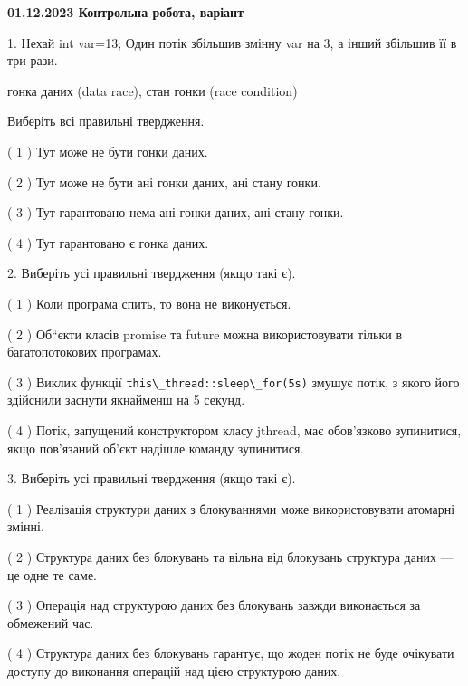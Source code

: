 \documentclass[12pt, ukrainian]{article}
\def\code#1{\Verb!#1!}
\begin{document}
\vspace{4mm}
\newpage
\begin {large}

\textbf{01.12.2023 Контрольна робота, варіант  }\par


{
1. Нехай int var=13; Один потік збільшив змінну var на 3, а інший збільшив її в три рази.

гонка даних (data race), стан гонки (race condition)

Виберіть всі правильні твердження.\par
\vspace{2mm}
( 1 ) Тут може не бути гонки даних.%

( 2 ) Тут може не бути ані гонки даних, ані стану гонки.%

( 3 ) Тут гарантовано нема ані гонки даних, ані стану гонки.%

( 4 ) Тут гарантовано є гонка даних.%


\vspace{5mm}
2. Виберіть усі правильні твердження (якщо такі є).\par
\vspace{2mm}

( 1 ) Коли програма спить, то вона не виконується.%

( 2 ) Об“єкти класів promise та future можна використовувати тільки в багатопотокових програмах.%

( 3 ) Виклик функції \code{this\_thread::sleep\_for(5s)} змушує потік, з якого його здійснили заснути якнайменш на 5 секунд.%

( 4 ) Потік, запущений конструктором класу jthread, має обов’язково зупинитися, якщо пов’язаний об’єкт надішле команду зупинитися.%


\vspace{5mm}
3. Виберіть усі правильні твердження (якщо такі є).\par
\vspace{2mm}

( 1 ) Реалізація структури даних з блокуваннями може використовувати атомарні змінні.%

( 2 ) Структура даних без блокувань та вільна від блокувань структура даних --- це одне те саме.%

( 3 ) Операція над структурою даних без блокувань завжди виконається за обмежений час.%

( 4 ) Структура даних без блокувань гарантує, що жоден потік не буде очікувати доступу до виконання операцій над цією структурою даних.%


}
\end{large}
\end{document}
